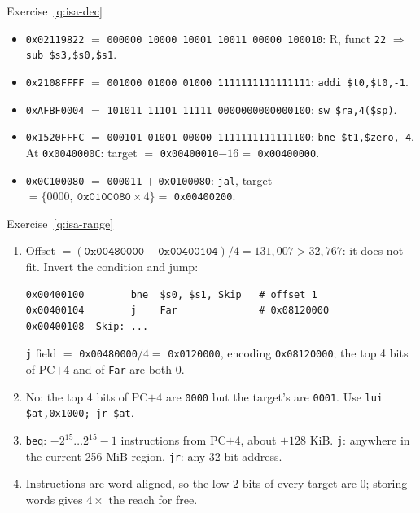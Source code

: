 \begin{noot}{Exercise~\ref{q:isa-dec}}
\begin{itemize}[leftmargin=*]
  \item \texttt{0x02119822} $=$ \texttt{000000 10000 10001 10011 00000 100010}:
  R, funct \texttt{22} $\Rightarrow$ \texttt{sub \$s3,\$s0,\$s1}.
  \item \texttt{0x2108FFFF} $=$ \texttt{001000 01000 01000 1111111111111111}:
  \texttt{addi \$t0,\$t0,-1}.
  \item \texttt{0xAFBF0004} $=$ \texttt{101011 11101 11111 0000000000000100}:
  \texttt{sw \$ra,4(\$sp)}.
  \item \texttt{0x1520FFFC} $=$ \texttt{000101 01001 00000 1111111111111100}:
  \texttt{bne \$t1,\$zero,-4}. At \texttt{0x0040000C}: target
  $=$ \texttt{0x00400010}$-16=$ \texttt{0x00400000}.
  \item \texttt{0x0C100080} $=$ \texttt{000011} $+$ \texttt{0x0100080}:
  \texttt{jal}, target $=\{0000,\ \texttt{0x0100080}\times4\}=$ \texttt{0x00400200}.
\end{itemize}
\end{noot}

\begin{noot}{Exercise~\ref{q:isa-range}}
\begin{enumerate}[label=(\alph*),leftmargin=*]
  \item Offset $=(\texttt{0x00480000}-\texttt{0x00400104})/4=131{,}007>32{,}767$:
  it does not fit. Invert the condition and jump:
\begin{lstlisting}
0x00400100        bne  $s0, $s1, Skip   # offset 1
0x00400104        j    Far              # 0x08120000
0x00400108  Skip: ...
\end{lstlisting}
  \texttt{j} field $=$ \texttt{0x00480000}$/4=$ \texttt{0x0120000}, encoding
  \texttt{0x08120000}; the top 4 bits of PC$+4$ and of \texttt{Far} are both 0.
  \item No: the top 4 bits of PC$+4$ are \texttt{0000} but the target's are
  \texttt{0001}. Use \texttt{lui \$at,0x1000; jr \$at}.
  \item \texttt{beq}: $-2^{15}\ldots2^{15}-1$ instructions from PC$+4$, about
  $\pm128$ KiB. \texttt{j}: anywhere in the current 256 MiB region.
  \texttt{jr}: any 32-bit address.
  \item Instructions are word-aligned, so the low 2 bits of every target are 0;
  storing words gives $4\times$ the reach for free.
\end{enumerate}
\end{noot}


